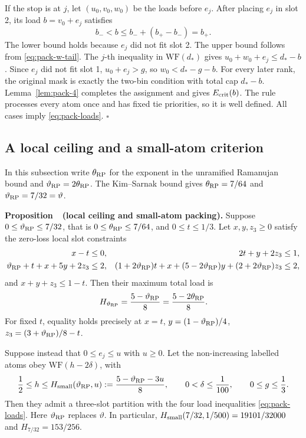 If the stop is at $j$, let $(u_0,v_0,w_0)$ be the loads before
$e_j$. After placing $e_j$ in slot 2, its load $b=v_0+e_j$ satisfies
\[
 b_-<b\le b_-+(b_+-b_-)=b_+.
\]
The lower bound holds because $e_j$ did not fit slot 2. The upper
bound follows from \eqref{eq:pack-w-tail}. The $j$-th inequality in
$\mathrm{WF}(d_*)$ gives
$u_0+w_0+e_j\le d_*-b$. Since $e_j$ did not fit slot 1,
$u_0+e_j>g$, so $w_0<d_*-g-b$. For every later rank, the original
mask is exactly the two-bin condition with total cap $d_*-b$.
Lemma~\ref{lem:pack-4} completes the assignment and gives $E_{\rm crit}(b)$.
The rule processes every atom once and has fixed tie priorities, so it
is well defined. All cases imply \eqref{eq:pack-loads}. \hfill$\square$

\subsection{A local ceiling and a small-atom criterion}

In this subsection write $\theta_{\rm RP}$ for the exponent in the
unramified Ramanujan bound and $\vartheta_{\rm RP}=2\theta_{\rm RP}$. The
Kim--Sarnak bound \cite{KS03} gives $\theta_{\rm RP}=7/64$ and
$\vartheta_{\rm RP}=7/32=\vartheta$.

\textbf{Proposition~\thetheorem\ (local ceiling and small-atom packing).}\label{prop:pack-ceiling}
Suppose
$0\le\vartheta_{\rm RP}\le7/32$, that is $0\le\theta_{\rm RP}\le7/64$,
and $0\le t\le1/3$. Let
$x,y,z_3\ge0$ satisfy the zero-loss local slot constraints
\[
\begin{aligned}
 x-t&\le0, &2t+y+2z_3&\le1,\\
 \vartheta_{\rm RP}+t+x+5y+2z_3&\le2,
 &(1+2\vartheta_{\rm RP})t+x+(5-2\vartheta_{\rm RP})y+(2+2\vartheta_{\rm RP})z_3&\le2,
\end{aligned}
\]
and $x+y+z_3\le1-t$. Then their maximum total load is
\[
 H_{\vartheta_{\rm RP}}=\frac{5-\vartheta_{\rm RP}}{8}=\frac{5-2\theta_{\rm RP}}8.
\]
For fixed $t$, equality holds precisely at
$x=t$, $y=(1-\vartheta_{\rm RP})/4$, $z_3=(3+\vartheta_{\rm RP})/8-t$.

Suppose instead that $0\le e_j\le u$ with $u\ge0$. Let the
non-increasing labelled atoms obey $\mathrm{WF}(h-2\delta)$, with
\[
 \frac12\le h\le H_{\rm small}(\vartheta_{\rm RP},u):=\frac{5-\vartheta_{\rm RP}-3u}{8},
 \qquad 0<\delta\le\frac1{100},\qquad 0\le g\le\frac13.
\]
Then they admit a three-slot partition with the four load
inequalities \eqref{eq:pack-loads}. Here $\vartheta_{\rm RP}$ replaces $\vartheta$.
In particular, $H_{\rm small}(7/32,1/500)=19101/32000$ and
$H_{7/32}=153/256$.

